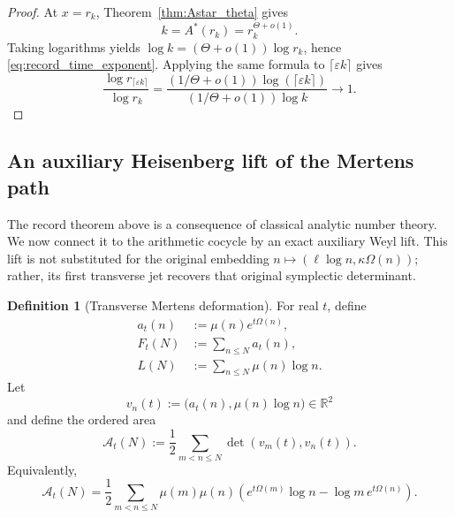 \documentclass[11pt]{amsart}
\numberwithin{equation}{section}
\theoremstyle{plain}
\theoremstyle{definition}
\newtheorem{definition}[theorem]{Definition}
\theoremstyle{remark}
\begin{document}
\begin{proof}
At \(x=r_k\), Theorem~\ref{thm:Astar_theta} gives
\begin{equation}
k=A^*(r_k)=r_k^{\Theta+o(1)}.
\label{eq:k_rk_theta}
\end{equation}
Taking logarithms yields
\(\log k=(\Theta+o(1))\log r_k\), hence
\eqref{eq:record_time_exponent}.  Applying the same formula to
\(\lceil\varepsilon k\rceil\) gives
\begin{equation}
\frac{\log r_{\lceil\varepsilon k\rceil}}{\log r_k}
=
\frac{(1/\Theta+o(1))\log(\lceil\varepsilon k\rceil)}
{(1/\Theta+o(1))\log k}
\longrightarrow1.
\label{eq:record_time_ratio_proof}
\end{equation}
\end{proof}

\subsection{An auxiliary Heisenberg lift of the Mertens path}
\label{subsec:aux_heisenberg_mertens}

The record theorem above is a consequence of classical analytic number theory.
We now connect it to the arithmetic cocycle by an exact auxiliary Weyl lift.
This lift is not substituted for the original embedding
\(n\mapsto(\ell\log n,\kappa\Omega(n))\); rather, its first transverse jet
recovers that original symplectic determinant.

\begin{definition}[Transverse Mertens deformation]
\label{def:Ft_At}
For real \(t\), define
\begin{align}
a_t(n)&:=\mu(n)e^{t\Omega(n)},
\label{eq:at_definition}\\
F_t(N)&:=\sum_{n\le N}a_t(n),
\label{eq:Ft_definition}\\
L(N)&:=\sum_{n\le N}\mu(n)\log n.
\label{eq:L_definition}
\end{align}
Let
\begin{equation}
v_n(t):=\bigl(a_t(n),\mu(n)\log n\bigr)\in\mathbb R^2
\label{eq:vn_auxiliary}
\end{equation}
and define the ordered area
\begin{equation}
\mathcal A_t(N)
:=
\frac12\sum_{m<n\le N}
\det(v_m(t),v_n(t)).
\label{eq:At_definition}
\end{equation}
Equivalently,
\begin{equation}
\mathcal A_t(N)
=
\frac12\sum_{m<n\le N}\mu(m)\mu(n)
\left(e^{t\Omega(m)}\log n-\log m\,e^{t\Omega(n)}\right).
\label{eq:At_double_sum}
\end{equation}
\end{definition}
\end{document}
